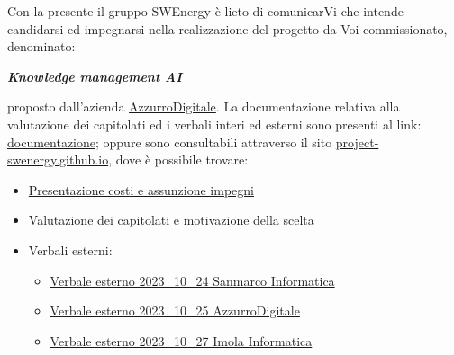 Con la presente il gruppo SWEnergy è lieto di comunicarVi che intende candidarsi
ed impegnarsi nella realizzazione del progetto da Voi commissionato, denominato:

\begin{center}
\textbf{\textit{Knowledge management AI}}
\end{center}

\noindent
proposto dall'azienda \href{https://www.azzurrodigitale.com/}{AzzurroDigitale}. 
La documentazione relativa alla valutazione dei capitolati ed i verbali
interi ed esterni sono presenti al link:
\href{https://github.com/Project-SWEnergy/documentazione}{documentazione};
oppure sono consultabili attraverso il sito 
\href{https://project-swenergy.github.io/}{project-swenergy.github.io},
dove è possibile trovare:

\begin{itemize}
	\item
		\href{https://github.com/Project-SWEnergy/documentazione/blob/main/Candidatura/Approvazione%20costi%20e%20assunzione%20impegni.pdf}{Presentazione costi e assunzione impegni}

	\item
		\href{https://github.com/Project-SWEnergy/documentazione/blob/main/Candidatura/Valutazione%20capitolati.pdf}{Valutazione dei capitolati e motivazione della scelta}
	
	\item Verbali esterni:
		\begin{itemize}
			\item
				\href{https://github.com/Project-SWEnergy/documentazione/blob/main/Candidatura/Verbali/Esterni/Verbale%20esterno%20-%202023_10_24%20Sanmarco.pdf}{Verbale esterno 2023\_10\_24 Sanmarco Informatica}
			\item
				\href{https://github.com/Project-SWEnergy/documentazione/blob/main/Candidatura/Verbali/Esterni/Verbale%20esterno%20-%202023_10_25%20AzzurroDigitale.pdf}{Verbale esterno 2023\_10\_25 AzzurroDigitale}
			\item
				\href{https://github.com/Project-SWEnergy/documentazione/blob/main/Candidatura/Verbali/Esterni/Verbale%20esterno%20-%202023_10_27%20Imola%20Informatica.pdf}{Verbale esterno 2023\_10\_27 Imola Informatica}
		\end{itemize}


\end{itemize}
